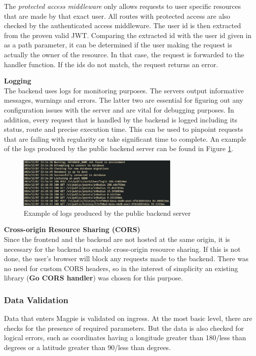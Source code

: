 The \textit{protected access middleware} only allows requests to user specific
resources that are made by that exact user. All routes with protected access are
also checked by the authenticated access middleware. The user id is then
extracted from the proven valid JWT. Comparing the extracted id with the user id
given in as a path parameter, it can be determined if the user making the
request is actually the owner of the resource. In that case, the request is
forwarded to the handler function. If the ids do not match, the request returns
an error.

\label{middleware_logging}\textbf{Logging}\\
The backend uses logs for monitoring purposes. The servers output informative
messages, warnings and errors. The latter two are essential for figuring out any
configuration issues with the server and are vital for debugging purposes. In
addition, every request that is handled by the backend is logged including its
status, route and precise execution time. This can be used to pinpoint requests
that are failing with regularity or take significant time to complete. An
example of the logs produced by the public backend server can be found in Figure
\ref{fig:backend_logging}.

\begin{figure}[htbp]
  \centering{}
  \includegraphics[width=0.7\textwidth]{images/backend_logging.png}
  \caption{Example of logs produced by the public backend server}
  \label{fig:backend_logging}
\end{figure}

\label{middleware_cors}\textbf{Cross-origin Resource Sharing (CORS)}\\
Since the frontend and the backend are not hosted at the same origin, it is
necessary for the backend to enable cross-origin resource sharing. If this is
not done, the user's browser will block any requests made to the backend. There
was no need for custom CORS headers, so in the interest of simplicity an
existing library (\textbf{Go CORS handler}) was chosen for this purpose.

\subsubsection{Data Validation}
Data that enters Magpie is validated on ingress. At the most basic level, there
are checks for the presence of required parameters. But the data is also checked
for logical errors, such as coordinates having a longitude greater than 180/less
than  degrees or a latitude greater than 90/less than  degrees.

